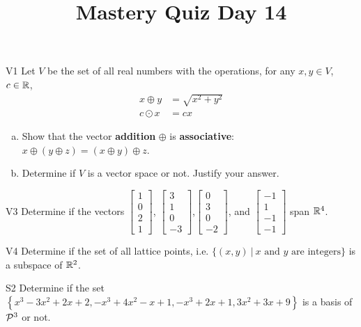 \documentclass{sbgLAquiz}
\title{Mastery Quiz Day 14 }
\begin{document}
\begin{problem}{V1}
Let $V$ be the set of all real numbers with the operations, for any $x, y \in V$, $c \in \IR$,
\begin{align*}
x \oplus y &= \sqrt{x^2+y^2} \\
c \odot x &= c x
\end{align*}
\begin{enumerate}[(a)]
\item Show that the vector \textbf{addition} $\oplus$ is \textbf{associative}:
      \(x \oplus (y \oplus z)=(x\oplus y)\oplus z\).
\item Determine if $V$ is a vector space or not.  Justify your answer.
\end{enumerate}
\end{problem}

\begin{problem}{V3}
Determine if the vectors $\begin{bmatrix} 1 \\ 0 \\ 2 \\1 \end{bmatrix}$, $\begin{bmatrix} 3 \\ 1 \\ 0 \\ -3 \end{bmatrix}$,$\begin{bmatrix} 0 \\ 3 \\ 0 \\ -2 \end{bmatrix}$, and $\begin{bmatrix}-1 \\ 1 \\ -1 \\ -1 \end{bmatrix}$ span $\IR^4$.
\end{problem}
\newpage

\begin{problem}{V4}
Determine if the set of all lattice points, i.e. $\{(x,y)\ \big|\ \text{$x$ and $y$ are integers} \}$ is a subspace of $\IR^2$.
\end{problem}

\begin{problem}{S2}
Determine if the set $\left\{ x^3-3x^2+2x+2, -x^3+4x^2-x+1, -x^3+2x+1, 3x^2+3x+9 \right\}$ is a basis of $\P^3$ or not.
\end{problem}
\end{document}
